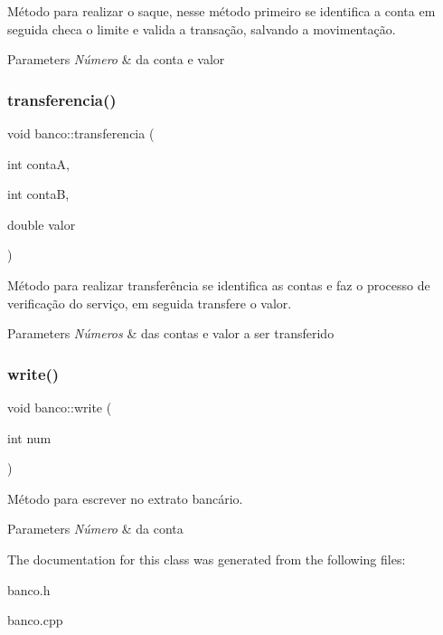 Método para realizar o saque, nesse método primeiro se identifica a conta em seguida checa o limite e valida a transação, salvando a movimentação. 


\begin{DoxyParams}{Parameters}
{\em Número} & da conta e valor \\
\hline
\end{DoxyParams}
\mbox{\label{classbanco_a81638b3957b2c422e58df4ace22d0d55}} 
\subsubsection{\texorpdfstring{transferencia()}{transferencia()}}
{\footnotesize\ttfamily void banco\+::transferencia (\begin{DoxyParamCaption}\item[{int}]{contaA,  }\item[{int}]{contaB,  }\item[{double}]{valor }\end{DoxyParamCaption})}



Método para realizar transferência se identifica as contas e faz o processo de verificação do serviço, em seguida transfere o valor. 


\begin{DoxyParams}{Parameters}
{\em Números} & das contas e valor a ser transferido \\
\hline
\end{DoxyParams}
\mbox{\label{classbanco_ac2ca2d3e9a02bf099e3b1deb5303c2ce}} 
\subsubsection{\texorpdfstring{write()}{write()}}
{\footnotesize\ttfamily void banco\+::write (\begin{DoxyParamCaption}\item[{int}]{num }\end{DoxyParamCaption})}



Método para escrever no extrato bancário. 


\begin{DoxyParams}{Parameters}
{\em Número} & da conta \\
\hline
\end{DoxyParams}


The documentation for this class was generated from the following files\+:\begin{DoxyCompactItemize}
\item 
banco.\+h\item 
banco.\+cpp\end{DoxyCompactItemize}
